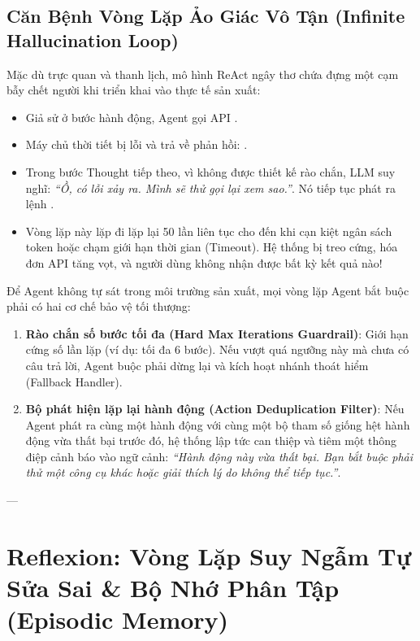 \subsection{Căn Bệnh Vòng Lặp Ảo Giác Vô Tận (Infinite Hallucination Loop)}
Mặc dù trực quan và thanh lịch, mô hình ReAct ngây thơ chứa đựng một cạm bẫy chết người khi triển khai vào thực tế sản xuất:
\begin{itemize}
  \item Giả sử ở bước hành động, Agent gọi API .
  \item Máy chủ thời tiết bị lỗi và trả về phản hồi: .
  \item Trong bước Thought tiếp theo, vì không được thiết kế rào chắn, LLM suy nghĩ: \textit{``Ồ, có lỗi xảy ra. Mình sẽ thử gọi lại xem sao.''}. Nó tiếp tục phát ra lệnh .
  \item Vòng lặp này lặp đi lặp lại 50 lần liên tục cho đến khi cạn kiệt ngân sách token hoặc chạm giới hạn thời gian (Timeout). Hệ thống bị treo cứng, hóa đơn API tăng vọt, và người dùng không nhận được bất kỳ kết quả nào!
\end{itemize}

\begin{debugbox}
Để Agent không tự sát trong môi trường sản xuất, mọi vòng lặp Agent bắt buộc phải có hai cơ chế bảo vệ tối thượng:
\begin{enumerate}
  \item \textbf{Rào chắn số bước tối đa (Hard Max Iterations Guardrail)}: Giới hạn cứng số lần lặp (ví dụ: tối đa 6 bước). Nếu vượt quá ngưỡng này mà chưa có câu trả lời, Agent buộc phải dừng lại và kích hoạt nhánh thoát hiểm (Fallback Handler).
  \item \textbf{Bộ phát hiện lặp lại hành động (Action Deduplication Filter)}: Nếu Agent phát ra cùng một hành động với cùng một bộ tham số giống hệt hành động vừa thất bại trước đó, hệ thống lập tức can thiệp và tiêm một thông điệp cảnh báo vào ngữ cảnh: \textit{``Hành động này vừa thất bại. Bạn bắt buộc phải thử một công cụ khác hoặc giải thích lý do không thể tiếp tục.''}.
\end{enumerate}
\end{debugbox}

---

\section{Reflexion: Vòng Lặp Suy Ngẫm Tự Sửa Sai \& Bộ Nhớ Phân Tập (Episodic Memory)}
\label{sec:reflexion-architecture}

